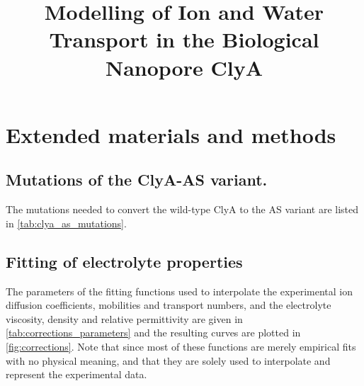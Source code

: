 \documentclass[journal=ancac3, manuscript=suppinfo, etalmode=truncate,maxauthors=0]{achemso}
\title{Modelling of Ion and Water Transport in the Biological Nanopore ClyA}
\begin{document}
	
\maketitle

\section{Extended materials and methods}
\subsection{Mutations of the ClyA-AS variant.}
The mutations needed to convert the wild-type ClyA to the AS variant are listed in \cref{tab:clya_as_mutations}.


\subsection{Fitting of electrolyte properties}
The parameters of the fitting functions used to interpolate the experimental ion diffusion coefficients, mobilities and transport numbers,
and the electrolyte viscosity, density and relative permittivity are given in \cref{tab:corrections_parameters} and 
the resulting curves are plotted in \cref{fig:corrections}.
Note that since most of these functions are merely empirical fits with no physical meaning,
and that they are solely used to interpolate and represent the experimental data.
\end{document}
